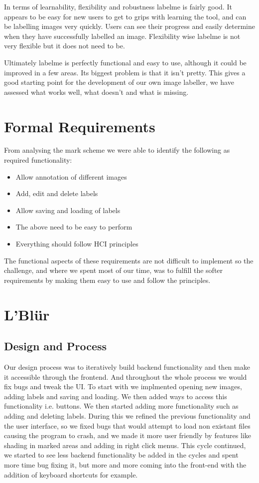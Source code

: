 \documentclass[a4paper,11pt,oneside]{article}
\begin{document}
In terms of learnability, flexibility and robustness labelme is fairly good. 
It appears to be easy for new users to get to grips with learning the tool, and
can be labelling images very quickly.  Users can see their progress and easily
determine when they have successfully labelled an image.  Flexibility wise
labelme is not very flexible but it does not need to be.

Ultimately labelme is perfectly functional and easy to use, although it could be
improved in a few areas.  Its biggest problem is that it isn't pretty.  This
gives a good starting point for the development of our own image labeller, we
have assessed what works well, what doesn't and what is missing.

\section{Formal Requirements}

From analysing the mark scheme we were able to identify the following as
required functionality:
\begin{itemize}
\item Allow annotation of different images
\item Add, edit and delete labels
\item Allow saving and loading of labels
\item The above need to be easy to perform
\item Everything should follow HCI principles
\end{itemize}
The functional aspects of these requirements are not difficult to implement so
the challenge, and where we spent most of our time, was to fulfill the softer
requirements by making them easy to use and follow the principles.

\section{L'Bl\"{u}r}

\subsection{Design and Process}
Our design process was to iteratively build backend functionality and then make
it accessible through the frontend.  And throughout the whole process we would
fix bugs and tweak the UI.  To start with we implmented opening new images,
adding labels and saving and loading.  We then added ways to access this
functionality i.e. buttons.  We then started adding more functionality such as
adding and deleting labels.  During this we refined the previous functionality
and the user interface, so we fixed bugs that would attempt to load non existant
files causing the program to crash, and we made it more user friendly by
features like shading in marked areas and adding in right click menus.  This
cycle continued, we started to see less backend functionality be added in the
cycles and spent more time bug fixing it, but more and more coming into the
front-end with the addition of keyboard shortcuts for example.
\end{document}
